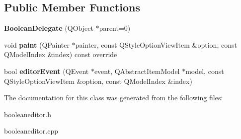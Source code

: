 \subsection*{Public Member Functions}
\begin{DoxyCompactItemize}
\item 
\mbox{\label{class_boolean_delegate_aacc5bab39e69a82f31f52881441abc08}} 
{\bfseries Boolean\+Delegate} (Q\+Object $\ast$parent=0)
\item 
\mbox{\label{class_boolean_delegate_a75f9ded6d0eeefef5d1a5ca1f0f51b46}} 
void {\bfseries paint} (Q\+Painter $\ast$painter, const Q\+Style\+Option\+View\+Item \&option, const Q\+Model\+Index \&index) const override
\item 
\mbox{\label{class_boolean_delegate_a161b7bcc5d5b0ef3022fb0bec0d5de52}} 
bool {\bfseries editor\+Event} (Q\+Event $\ast$event, Q\+Abstract\+Item\+Model $\ast$model, const Q\+Style\+Option\+View\+Item \&option, const Q\+Model\+Index \&index)
\end{DoxyCompactItemize}


The documentation for this class was generated from the following files\+:\begin{DoxyCompactItemize}
\item 
booleaneditor.\+h\item 
booleaneditor.\+cpp\end{DoxyCompactItemize}
